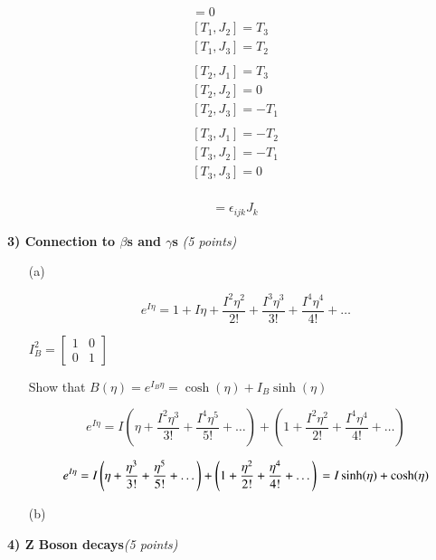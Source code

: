 {\begin{itemize}
{\begin{align*}
[T_1,J_1] = 0  \\
[T_1,J_2] = T_3 \\
[T_1,J_3] = T_2 \\
\\
[T_2,J_1] = T_3\\
[T_2,J_2] = 0 \\
[T_2,J_3] = -T_1 \\
\\
[T_3,J_1] = -T_2 \\
[T_3,J_2] = -T_1 \\
[T_3,J_3] = 0 \\
\end{align*}

\begin{align*}
[J_i,J_j] = \epsilon_{ijk} J_k 
\end{align*}


}

\end{itemize}

\vspace*{0.25in}


\textbf{3) Connection to $\beta$s and  $\gamma$s} \hfill \textit{(5 points)}
\begin{itemize}
\item[(a)]{

\begin{equation*}
e^{I\eta} = 1 + I\eta + \frac{I^2\eta^2}{2!} + \frac{I^3\eta^3}{3!} + \frac{I^4\eta^4}{4!} + \dots
\end{equation*}

$I_B^2 = \begin{bmatrix} 1 & 0  \\ 0 & 1 \end{bmatrix} $

Show that $B(\eta) = e^{I_B\eta} = \cosh(\eta)+ I_B \sinh(\eta)$


\begin{equation*}
e^{I\eta} = I\left(\eta + \frac{I^2\eta^3}{3!} + \frac{I^4\eta^5}{5!} + \dots \right) + \left(1 + \frac{I^2\eta^2}{2!} + \frac{I^4\eta^4}{4!}  + \dots \right)
\end{equation*}

\begin{equation*}
e^{I\eta} = I\left(\eta + \frac{\eta^3}{3!} + \frac{\eta^5}{5!} + \dots \right) + \left(1 + \frac{\eta^2}{2!} + \frac{\eta^4}{4!}  + \dots \right) \\
= I \sinh(\eta) + \cosh(\eta)
\end{equation*}

}


\item[(b)]{
}

\end{itemize}

\vspace*{0.25in}


\textbf{4) Z Boson decays}\hfill \textit{(5 points)}}
